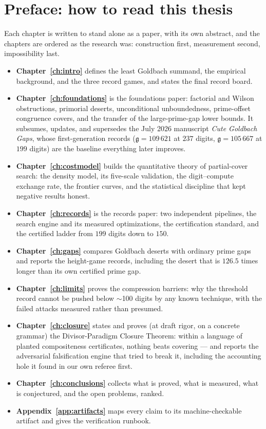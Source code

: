 \documentclass[11pt,oneside]{report}
\theoremstyle{plain}
\theoremstyle{definition}
\theoremstyle{remark}
\newcommand{\g}{\mathfrak{g}}
\begin{document}
\chapter*{Preface: how to read this thesis}

Each chapter is written to stand alone as a paper, with its own abstract,
and the chapters are ordered as the research was: construction first,
measurement second, impossibility last.

\begin{itemize}
\item \textbf{Chapter~\ref{ch:intro}} defines the least Goldbach summand,
  the empirical background, and the three record games, and states the
  final record board.
\item \textbf{Chapter~\ref{ch:foundations}} is the foundations paper:
  factorial and Wilson obstructions, primorial deserts, unconditional
  unboundedness, prime-offset congruence covers, and the transfer of the
  large-prime-gap lower bounds. It subsumes, updates, and supersedes the
  July 2026 manuscript \emph{Cute Goldbach Gaps}, whose first-generation
  records ($\g=109\,621$ at $237$ digits, $\g=105\,667$ at $199$ digits)
  are the baseline everything later improves.
\item \textbf{Chapter~\ref{ch:costmodel}} builds the quantitative theory
  of partial-cover search: the density model, its five-scale validation,
  the digit--compute exchange rate, the frontier curves, and the
  statistical discipline that kept negative results honest.
\item \textbf{Chapter~\ref{ch:records}} is the records paper: two
  independent pipelines, the search engine and its measured
  optimizations, the certification standard, and the certified ladder
  from $199$ digits down to $150$.
\item \textbf{Chapter~\ref{ch:gaps}} compares Goldbach deserts with
  ordinary prime gaps and reports the height-game records, including the
  desert that is $126.5$ times longer than its own certified prime gap.
\item \textbf{Chapter~\ref{ch:limits}} proves the compression barriers:
  why the threshold record cannot be pushed below $\sim$100 digits by
  any known technique, with the failed attacks measured rather than
  presumed.
\item \textbf{Chapter~\ref{ch:closure}} states and proves (at draft
  rigor, on a concrete grammar) the Divisor-Paradigm Closure Theorem:
  within a language of planted compositeness certificates, nothing beats
  covering --- and reports the adversarial falsification engine that
  tried to break it, including the accounting hole it found in our own
  referee first.
\item \textbf{Chapter~\ref{ch:conclusions}} collects what is proved,
  what is measured, what is conjectured, and the open problems, ranked.
\item \textbf{Appendix~\ref{app:artifacts}} maps every claim to its
  machine-checkable artifact and gives the verification runbook.
\end{itemize}
\end{document}
